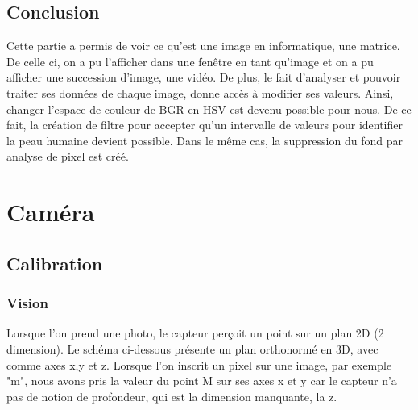 \documentclass[12pt, french]{report}
\begin{document}
    \subsection{Conclusion}
    
    Cette partie a permis de voir ce qu'est une image en informatique, une matrice. De celle ci, on a pu l'afficher dans une fenêtre en tant qu'image et on a pu afficher une succession d'image, une vidéo. De plus, le fait d'analyser et pouvoir traiter ses données de chaque image, donne accès à modifier ses valeurs. Ainsi, changer l'espace de couleur de BGR en HSV est devenu possible pour nous. De ce fait, la création de filtre pour accepter qu'un intervalle de valeurs pour identifier la peau humaine devient possible. Dans le même cas, la suppression du fond par analyse de pixel est créé. 
    \newpage
\section{Caméra}
\subsection{Calibration}
\subsubsection{Vision}
Lorsque l'on prend une photo, le capteur perçoit un point sur un plan 2D (2 dimension). Le schéma ci-dessous présente un plan orthonormé en 3D, avec comme axes x,y et z. Lorsque l'on inscrit un pixel sur une image, par exemple "m", nous avons pris la valeur du point M sur ses axes x et y car le capteur n'a pas de notion de profondeur, qui est la dimension manquante, la z.

\begin{center}
\end{center}
\end{document}
